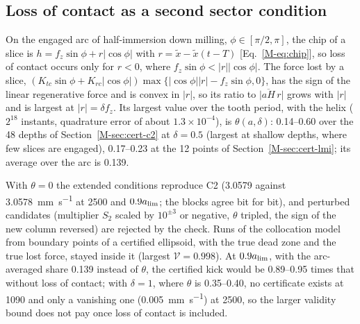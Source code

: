 \subsection{Loss of contact as a second sector condition}\label{supp:contact}

On the engaged arc of half-immersion down milling, $\phi\in[\pi/2,\pi]$, the chip of a slice is $h=f_z\sin\phi+r\lvert\cos\phi\rvert$ with $r=\tilde x-\tilde x(t-T)$ [Eq.~\eqref{M-eq:chip}], so loss of contact occurs only for $r<0$, where $f_z\sin\phi<\lvert r\rvert\lvert\cos\phi\rvert$. The force lost by a slice, $(K_{tc}\sin\phi+K_{rc}\lvert\cos\phi\rvert)\max\{\lvert\cos\phi\rvert\lvert r\rvert-f_z\sin\phi,0\}$, has the sign of the linear regenerative force and is convex in $\lvert r\rvert$, so its ratio to $\lvert\overline{aH}\,r\rvert$ grows with $\lvert r\rvert$ and is largest at $\lvert r\rvert=\delta f_z$. Its largest value over the tooth period, with the helix ($2^{18}$ instants, quadrature error of about $1.3\times10^{-4}$), is $\theta(a,\delta)$: 0.14--0.60 over the 48 depths of Section~\ref{M-sec:cert-c2} at $\delta=0.5$ (largest at shallow depths, where few slices are engaged), 0.17--0.23 at the 12 points of Section~\ref{M-sec:cert-lmi}; its average over the arc is 0.139.

With $\theta=0$ the extended conditions reproduce C2 (\SI{3.0579}{} against \SI{3.0578}{\milli\metre\per\second} at \SI{2500}{\rpm} and $0.9a_{\lim}$; the blocks agree bit for bit), and perturbed candidates (multiplier $S_2$ scaled by $10^{\pm3}$ or negative, $\theta$ tripled, the sign of the new column reversed) are rejected by the check. Runs of the collocation model from boundary points of a certified ellipsoid, with the true dead zone and the true lost force, stayed inside it (largest $\mathcal V=0.998$). At $0.9a_{\lim}$, with the arc-averaged share 0.139 instead of $\theta$, the certified kick would be 0.89--\SI{0.95}{} times that without loss of contact; with $\delta=1$, where $\theta$ is 0.35--0.40, no certificate exists at \SI{1090}{\rpm} and only a vanishing one (\SI{0.005}{\milli\metre\per\second}) at \SI{2500}{\rpm}, so the larger validity bound does not pay once loss of contact is included.

